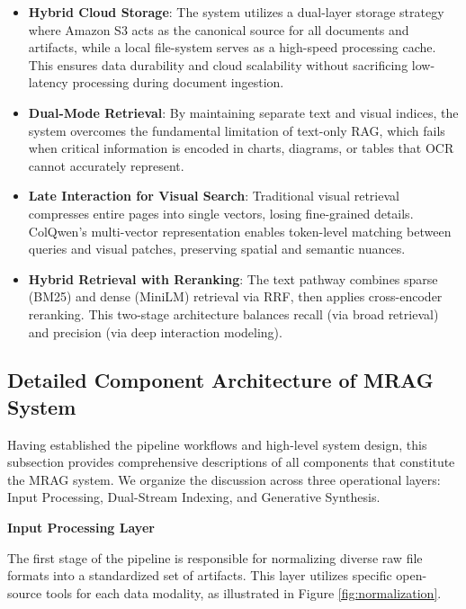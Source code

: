 \begin{itemize}
    \item \textbf{Hybrid Cloud Storage}: The system utilizes a dual-layer storage strategy where Amazon S3 acts as the canonical source for all documents and artifacts, while a local file-system serves as a high-speed processing cache. This ensures data durability and cloud scalability without sacrificing low-latency processing during document ingestion.
    
    \item \textbf{Dual-Mode Retrieval}: By maintaining separate text and visual indices, the system overcomes the fundamental limitation of text-only RAG, which fails when critical information is encoded in charts, diagrams, or tables that OCR cannot accurately represent.
    
    \item \textbf{Late Interaction for Visual Search}: Traditional visual retrieval compresses entire pages into single vectors, losing fine-grained details. ColQwen's multi-vector representation enables token-level matching between queries and visual patches, preserving spatial and semantic nuances.
    
    \item \textbf{Hybrid Retrieval with Reranking}: The text pathway combines sparse (BM25) and dense (MiniLM) retrieval via RRF, then applies cross-encoder reranking. This two-stage architecture balances recall (via broad retrieval) and precision (via deep interaction modeling).
\end{itemize}

\subsection{Detailed Component Architecture of MRAG System}

Having established the pipeline workflows and high-level system design, this subsection provides comprehensive descriptions of all components that constitute the MRAG system. We organize the discussion across three operational layers: Input Processing, Dual-Stream Indexing, and Generative Synthesis.

\textbf{Input Processing Layer}

The first stage of the pipeline is responsible for normalizing diverse raw file formats into a standardized set of artifacts. This layer utilizes specific open-source tools for each data modality, as illustrated in Figure \ref{fig:normalization}.

